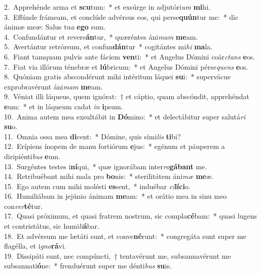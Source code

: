{2.~}Apprehénde arma et \textbf{scu}tum:~* et exsúrge in adjutóri\textit{um} \textbf{mi}hi.\\
{3.~}Effúnde frámeam, et conclúde advérsus eos, qui perse\textbf{quún}tur me:~* dic ánimæ meæ: Salus tu\textit{a} \textbf{e}\textbf{go} sum.\\
{4.~}Confundántur et revere\textbf{án}tur,~* quæréntes áni\textit{mam} \textbf{me}am.\\
{5.~}Avertántur retrórsum, et confun\textbf{dán}tur~* cogitántes mi\textit{hi} \textbf{ma}la.\\
{6.~}Fiant tamquam pulvis ante fáciem \textbf{ven}ti:~* et Angelus Dómini coár\textit{ctans} \textbf{e}os.\\
{7.~}Fiat via illórum ténebræ et \textbf{lú}bricum:~* et Angelus Dómini pérse\textit{quens} \textbf{e}os.\\
{8.~}Quóniam gratis abscondérunt mihi intéritum láquei \textbf{su}i:~* supervácue exprobravérunt áni\textit{mam} \textbf{me}am.\\
{9.~}Véniat illi láqueus, quem ignórat:~† et cáptio, quam abscóndit, apprehéndat \textbf{e}um:~* et in láqueum cadat \textit{in} \textbf{i}psum.\\
{10.~}Anima autem mea exsultábit in \textbf{Dó}mino:~* et delectábitur super salutá\textit{ri} \textbf{su}o.\\
{11.~}Omnia ossa mea \textbf{di}cent:~* Dómine, quis sími\textit{lis} \textbf{ti}bi?\\
{12.~}Erípiens ínopem de manu fortiórum \textbf{e}jus:~* egénum et páuperem a diripiénti\textit{bus} \textbf{e}um.\\
{13.~}Surgéntes testes i\textbf{ní}qui,~* quæ ignorábam inter\textit{ro}\textbf{gá}\textbf{bant} me.\\
{14.~}Retribuébant mihi mala pro \textbf{bo}nis:~* sterilitátem áni\textit{mæ} \textbf{me}æ.\\
{15.~}Ego autem cum mihi molésti \textbf{es}sent,~* induébar \textit{ci}\textbf{lí}\textbf{ci}o.\\
{16.~}Humiliábam in jejúnio ánimam \textbf{me}am:~* et orátio mea in sinu meo con\textit{ver}\textbf{té}tur.\\
{17.~}Quasi próximum, et quasi fratrem nostrum, sic compla\textbf{cé}bam:~* quasi lugens et contristátus, sic humi\textit{li}\textbf{á}bar.\\
{18.~}Et advérsum me lætáti sunt, et conve\textbf{né}runt:~* congregáta sunt super me flagélla, et i\textit{gno}\textbf{rá}vi.\\
{19.~}Dissipáti sunt, nec compúncti,~† tentavérunt me, subsannavérunt me subsannati\textbf{ó}ne:~* frenduérunt super me dénti\textit{bus} \textbf{su}is.\\
